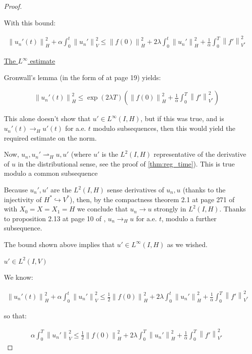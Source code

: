 \documentclass[english,a4paper,12pt,oneside]{scrbook}
\theoremstyle{break}
\newenvironment{mproof}[1][\proofname]{%
  \begin{proof}[#1]$ $\par\nobreak\ignorespaces
}{%
  \end{proof}
}
\renewcommand*{\proofname}{Proof}
\theoremstyle{remark}
\newcommand{\norm}[1]{\left\lVert#1\right\rVert}
\newcommand{\HN}[1]{\norm{#1}_{H}}
\newcommand{\VN}[1]{\norm{#1}_{V}}
\newcommand{\VSN}[1]{\norm{#1}_{V^*}}
\newcommand{\emb}{\hookrightarrow}
\begin{document}
\begin{mproof}
With this bound:

\begin{align*}
\HN{u_n'(t)}^2 + \alpha \int_0^t \VN{u_n'}^2 \leq \HN{f(0)}^2+ 2\lambda \int_0^t \HN{u_n'}^2 +\frac{1}{\alpha} \int_0^T \VSN{ f'}^2
\end{align*}

\underline{The $L^\infty$ estimate}

Gronwall's lemma (in the form of \cite{gilardi} at page 19) yields:

\begin{align*}
\HN{u_n'(t)}^2 \leq \exp(2\lambda T) \left (  \HN{f(0)}^2 +\frac{1}{\alpha} \int_0^T \VSN{ f'}^2\right )
\end{align*}

This alone doesn't show that $u'\in L^\infty(I,H)$, but if this was true, and is $u_n'(t)\rightarrow_H u'(t)$ for a.e. $t$ modulo subsequences, then this would yield the required estimate on the norm.

Now, $u_n, u_n' \rightharpoonup_H u, u'$ (where $u'$ is the $L^2(I,H)$ representative of the derivative of $u$ in the distributional sense, see the proof of \cref{thm:reg_time}). This is true modulo a common subsequence


Because $u_n', u'$ are the $L^2(I,H)$ sense derivatives of $u_n, u$ (thanks to the injectivity of $H^* \emb V^*$), then, by the compactness theorem 2.1 at page 271 of \cite{navier_stokes} with $X_0=X=X_1=H$ we conclude that $u_n \rightarrow u$ strongly in $L^2(I,H)$. Thanks to proposition 2.13 at page 10 of \cite{kreuter}, $u_n\rightarrow_H u$ for a.e. $t$, modulo a further subsequence.

The bound shown above implies that $u' \in L^\infty(I,H)$ as we wished. 

\underline{$u' \in L^2(I,V)$}


We know:


\begin{align*}
\HN{u_n'(t)}^2 + \alpha \int_0^t \VN{u_n'}^2 \leq \frac{1}{2} \HN{f(0)}^2+ 2\lambda \int_0^t \HN{u_n'}^2 +\frac{1}{\alpha} \int_0^T \VSN{ f'}^2
\end{align*}

so that:


\begin{align*}
\alpha \int_0^T \VN{u_n'}^2 \leq \frac{1}{2} \HN{f(0)}^2+ 2\lambda \int_0^T \HN{u_n'}^2 +\frac{1}{\alpha} \int_0^T \VSN{ f'}^2
\end{align*}


\end{mproof}
\end{document}
